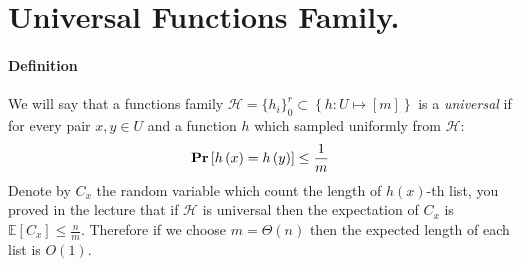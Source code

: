 \newpage

\section{Universal Functions Family.}

\paragraph{Definition} We will say that a functions family \( \mathcal{H} = \{ h_i \}_{0}^{r} \subset \left\{ h : U \mapsto \left[m\right] \right\} \) is a \textit{universal} if for every pair \( x,y \in U \) and a function \(h\) which sampled uniformly from \(\mathcal{H} \): \begin{equation*}
    \mathbf{Pr} \left[ { h\left(x\right) = h\left(y\right) } \right] \le \frac{1}{m} 
\end{equation*}  
Denote by \( C_x \) the random variable which count the length of \(h\left(x\right)\)-th list, you proved in the lecture that if \(\mathcal{H}\) is universal then the expectation of \(C_x\) is \( \mathbb{E}\left[C_x\right] \le \frac{n}{m} \). Therefore if we choose \( m = \Theta \left(n \right)\) then the expected length of each list is \( O(1) \).   

